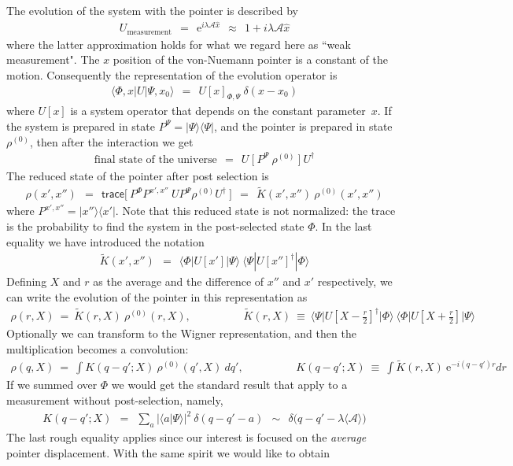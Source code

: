 \documentclass[onecolumn,fleqn, 11pt]{revtex4}
\newcommand{\trc}{\mathsf{trace}}
\newcommand{\eexp}{\mathrm{e}^}
\newcommand{\tbox}[1]{\text{#1}}
\newcommand{\beq}{\begin{eqnarray}}
\newcommand{\eeq}{\end{eqnarray}}
\begin{document}
The evolution of the system with the pointer is described by 
\beq
U_{\tbox{measurement}} \ \ = \ \ \eexp{i\lambda \mathcal{A} \hat{x}}  
\ \ \approx \ \ 1+i\lambda \mathcal{A} \hat{x}
\eeq
where the latter approximation holds for what we regard here as ``weak measurement".
The $x$ position of the von-Nuemann pointer is 
a constant of the motion. Consequently the representation 
of the evolution operator is  
\beq
\langle \Phi, x|U| \Psi, x_0 \rangle \ \ = \ \ U[x]_{\Phi,\Psi} \ \delta(x-x_0)
\eeq
where $U[x]$ is a system operator that depends 
on the constant parameter~$x$.    
If the system is prepared in state $P^{\Psi} = |\Psi\rangle\langle\Psi|$, 
and the pointer is prepared in state $\rho^{(0)}$, 
then after the interaction we get 
\beq
\mbox{final state of the universe} \ \ = \ \  U \ \Big[ \ P^{\Psi} \ \rho^{(0)} \ \Big] \ U^{\dag}
\eeq
The reduced state of the pointer after post selection is 
\beq
\rho(x',x'') 
\ \ = \ \ \trc\Big[ \ P^{\Phi} P^{x',x''} \  U P^{\Psi} \rho^{(0)} U^{\dag} \  \Big]
\ \ = \ \ \tilde{K}(x',x'') \ \rho^{(0)}(x',x'') 
\eeq
where $P^{x',x''}=|x'' \rangle\langle x'|$.
Note that this reduced state is not normalized: 
the trace is the probability to find the system 
in the post-selected state $\Phi$.
In the last equality we have introduced the notation    
\beq
\tilde{K}(x',x'') \ \ = \ \ \langle \Phi | U[x'] | \Psi \rangle \ \langle \Psi | U[x'']^{\dag} | \Phi \rangle
\eeq
Defining $X$ and $r$ as the average and the difference 
of $x''$ and $x'$ respectively, we can write the evolution 
of the pointer in this representation as 
\beq
\rho(r,X) \ = \ \tilde{K}(r,X) \ \rho^{(0)}(r,X),
\hspace{2cm}
\tilde{K}(r,X) \ \equiv \ \Big\langle \Psi \Big| U\left[X-\frac{r}{2}\right]^{\dag} \Big| \Phi \Big\rangle  
\ \Big\langle \Phi \Big| U\left[X+\frac{r}{2}\right] \Big| \Psi \Big\rangle  
\eeq
Optionally we can transform to the Wigner 
representation, and then the multiplication 
becomes a convolution: 
\beq
\rho(q,X) \ = \  \int K(q{-}q';X) \ \rho^{(0)}(q',X) \ dq',
\hspace{2cm}
K(q{-}q';X) \ \equiv \ \int  \tilde{K}(r,X) \ \eexp{-i(q{-}q')r} dr
\eeq
If we summed over $\Phi$ we would get the standard result 
that apply to a measurement without post-selection, namely, 
\beq
K(q{-}q';X) 
\ \ = \ \ \sum_a |\langle a | \Psi \rangle|^2 \ \delta(q-q'-a) 
\ \ \sim \ \ \delta\Big(q-q'-\lambda \langle \mathcal{A} \rangle \Big)
\eeq
The last rough equality applies since our interest 
is focused on the {\em average} pointer displacement.    
With the same spirit we would like to obtain 
\end{document}
